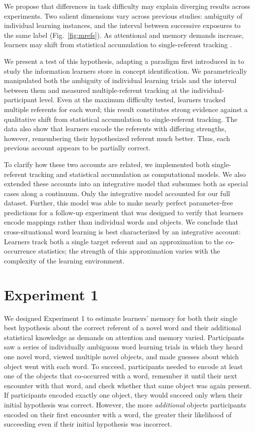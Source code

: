 \documentclass[authoryear,review]{elsarticle}
\begin{document}
We propose that differences in task difficulty may explain diverging results across experiments. Two salient dimensions vary across previous studies: ambiguity of individual learning instances, and the interval between successive exposures to the same label (Fig.~\ref{fig:mrefs}). As attentional and memory demands increase, learners may shift from statistical accumulation to single-referent tracking \citep{Smith2011a, Trueswell2013}. 

We present a test of this hypothesis, adapting a paradigm first introduced in \citet{Bower1963} to study the information learners store in concept identification. We parametrically manipulated both the ambiguity of individual learning trials and the interval between them and measured multiple-referent tracking at the individual-participant level. Even at the maximum difficulty tested, learners tracked multiple referents for each word; this result constitutes strong evidence against a qualitative shift from statistical accumulation to single-referent tracking. The data also show that learners encode the referents with differing strengths, however, remembering their hypothesized referent much better. Thus, each previous account appears to be partially correct. 

To clarify how these two accounts are related, we implemented both single-referent tracking and statistical accumulation as computational models. We also extended these accounts into an integrative model that subsumes both as special cases along a continuum. Only the integrative model accounted for our full dataset. Further, this model was able to make nearly perfect parameter-free predictions for a follow-up experiment that was designed to verify that learners encode mappings rather than individual words and objects. We conclude that cross-situational word learning is best characterized by an integrative account: Learners track both a single target referent and an approximation to the co-occurrence statistics; the strength of this approximation varies with the complexity of the learning environment.

\section{Experiment 1}

We designed Experiment 1 to estimate learners' memory for both their single best hypothesis about the correct referent of a novel word and their additional statistical knowledge as demands on attention and memory varied. Participants saw a series of individually ambiguous word learning trials in which they heard one novel word, viewed multiple novel objects, and made guesses about which object went with each word. To succeed, participants needed to encode at least one of the objects that co-occurred with a word, remember it until their next encounter with that word, and check whether that same object was again present. If participants encoded exactly one object, they would succeed only when their initial hypothesis was correct. However, the more \emph{additional} objects participants encoded on their first encounter with a word, the greater their likelihood of succeeding even if their initial hypothesis was incorrect. 
\end{document}
